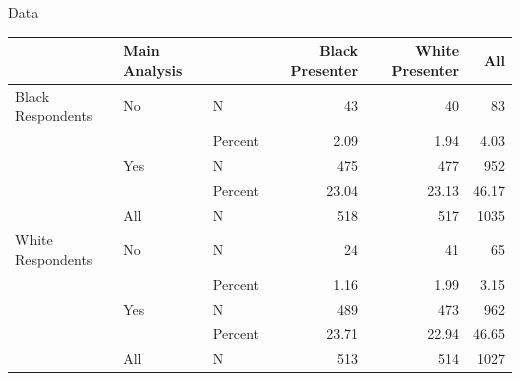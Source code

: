 \documentclass[10pt]{beamer}
\begin{document}
\begin{frame}{Data}
\begin{adjustbox}{width=\textwidth, totalheight=\textheight-\baselineskip,keepaspectratio}

    \begin{tabular}[t]{lllrrr}
\toprule
  & Main Analysis &    & Black
Presenter & White
Presenter & All\\
\midrule
Black Respondents & No & N & 43 & 40 & 83\\
 &  & Percent & \num{2.09} & \num{1.94} & \num{4.03}\\
 & Yes & N & 475 & 477 & 952\\
 &  & Percent & \num{23.04} & \num{23.13} & \num{46.17}\\
 & All & N & 518 & 517 & 1035\\
White Respondents & No & N & 24 & 41 & 65\\
 &  & Percent & \num{1.16} & \num{1.99} & \num{3.15}\\
 & Yes & N & 489 & 473 & 962\\
 &  & Percent & \num{23.71} & \num{22.94} & \num{46.65}\\
 & All & N & 513 & 514 & 1027\\
\bottomrule
\end{tabular}
\end{adjustbox}
\end{frame}
\end{document}
